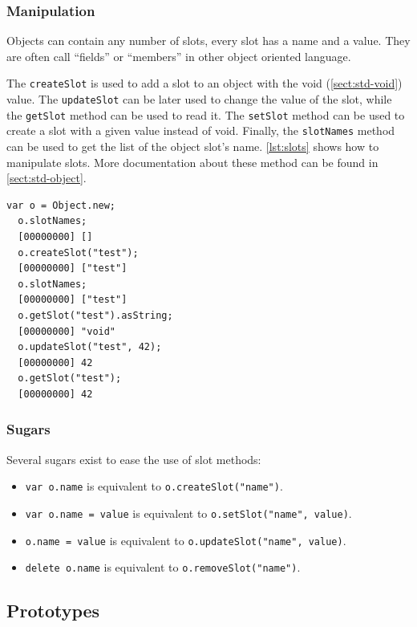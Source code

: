\documentclass[openright,twoside,12pt]{report}
\newcommand   {\floatpos}          {htbp}
\newcommand{\lst}[1]{\autoref{lst:#1}}
\newcommand{\sect}[1]{\autoref{sect:#1}}
\begin{document}
\subsubsection{Manipulation}

Objects can contain any number of slots, every slot has a name and a
value. They are often call ``fields'' or ``members'' in other object
oriented language.

The \lstinline|createSlot| is used to add a slot to an object with the
void (\sect{std-void}) value. The \lstinline|updateSlot| can be later
used to change the value of the slot, while the \lstinline|getSlot|
method can be used to read it. The \lstinline|setSlot| method can be
used to create a slot with a given value instead of void. Finally, the
\lstinline|slotNames| method can be used to get the list of the object
slot's name. \lst{slots} shows how to manipulate slots. More
documentation about these method can be found in \sect{std-object}.

\begin{lstlisting}[caption=Manipulating slots, label=lst:slots,
  float=\floatpos]
  var o = Object.new;
  o.slotNames;
  [00000000] []
  o.createSlot("test");
  [00000000] ["test"]
  o.slotNames;
  [00000000] ["test"]
  o.getSlot("test").asString;
  [00000000] "void"
  o.updateSlot("test", 42);
  [00000000] 42
  o.getSlot("test");
  [00000000] 42
\end{lstlisting}

\subsubsection{Sugars}

Several sugars exist to ease the use of slot methods:

\begin{itemize}
\item \lstinline|var o.name| is equivalent to
  \lstinline|o.createSlot("name")|.
\item \lstinline|var o.name = value| is equivalent to
  \lstinline|o.setSlot("name", value)|.
\item \lstinline|o.name = value| is equivalent to
  \lstinline|o.updateSlot("name", value)|.
\item \lstinline|delete o.name| is equivalent to
  \lstinline|o.removeSlot("name")|.
\end{itemize}


\subsection{Prototypes}
\end{document}
